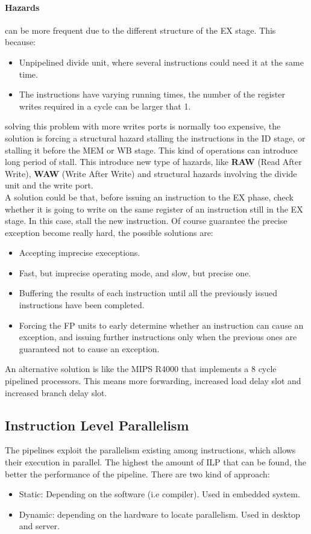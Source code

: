 \documentclass[12pt]{article}
\begin{document}
\paragraph{Hazards} can be more frequent due to the different structure of the EX stage. This because:
\begin{itemize}
  \item Unpipelined divide unit, where several instructions could need it at the same time.
  \item The instructions have varying running times, the number of the register writes required in a cycle can be larger that 1.
\end{itemize}
solving this problem with more writes ports is normally too expensive, the solution is forcing a structural hazard stalling the instructions in the ID stage, or stalling it before the MEM or WB stage. This kind of operations can introduce long period of stall. This introduce new type of hazards, like \textbf{RAW} (Read After Write), \textbf{WAW} (Write After Write) and  structural hazards involving the divide unit and the write port.\\
A solution could be that, before issuing an instruction to the EX phase, check whether it is going to write on the same register of an instruction still in the EX stage. In this case, stall the new instruction. Of course guarantee the precise exception become really hard, the possible solutions are:
\begin{itemize}
  \item Accepting imprecise execeptions.
  \item Fast, but imprecise operating mode, and slow, but precise one.
  \item Buffering the results of each instruction until all the previously issued instructions have been completed.
  \item Forcing the FP units to early determine whether an instruction can cause an exception, and issuing further instructions only when the previous ones are guaranteed not to cause an exception.
\end{itemize}
An alternative solution is like the MIPS R4000 that implements a 8 cycle pipelined processors. This means more forwarding, increased load delay slot and increased branch delay slot.

\subsection{Instruction Level Parallelism}
The pipelines exploit the parallelism existing among instructions, which allows their execution in parallel. The highest the amount of ILP that can be found, the better the performance of the pipeline. There are two kind of approach:
\begin{itemize}
  \item Static: Depending on the software (i.e compiler). Used in embedded system.
  \item Dynamic: depending on the hardware to locate parallelism. Used in desktop and server.
\end{itemize}
\end{document}
